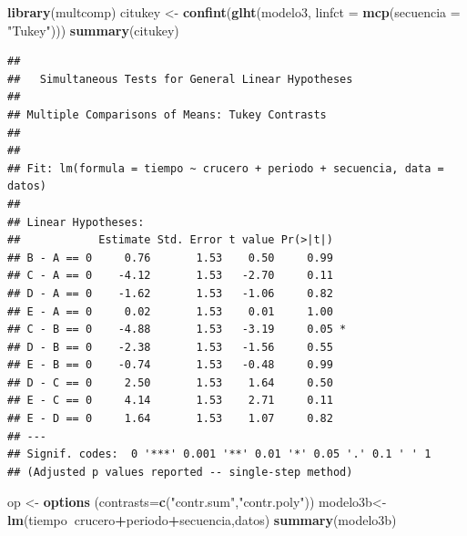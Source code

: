 \documentclass[]{book}
\newenvironment{Shaded}{\begin{snugshade}}{\end{snugshade}}
\newcommand{\KeywordTok}[1]{\textcolor[rgb]{0.13,0.29,0.53}{\textbf{#1}}}
\newcommand{\DataTypeTok}[1]{\textcolor[rgb]{0.13,0.29,0.53}{#1}}
\newcommand{\StringTok}[1]{\textcolor[rgb]{0.31,0.60,0.02}{#1}}
\newcommand{\OperatorTok}[1]{\textcolor[rgb]{0.81,0.36,0.00}{\textbf{#1}}}
\newcommand{\NormalTok}[1]{#1}
\begin{document}
\begin{Shaded}
\begin{Highlighting}[]
\KeywordTok{library}\NormalTok{(multcomp)}
\NormalTok{citukey <-}\StringTok{ }\KeywordTok{confint}\NormalTok{(}\KeywordTok{glht}\NormalTok{(modelo3, }\DataTypeTok{linfct =} \KeywordTok{mcp}\NormalTok{(}\DataTypeTok{secuencia =} \StringTok{"Tukey"}\NormalTok{)))}
\KeywordTok{summary}\NormalTok{(citukey)}
\end{Highlighting}
\end{Shaded}

\begin{verbatim}
## 
##   Simultaneous Tests for General Linear Hypotheses
## 
## Multiple Comparisons of Means: Tukey Contrasts
## 
## 
## Fit: lm(formula = tiempo ~ crucero + periodo + secuencia, data = datos)
## 
## Linear Hypotheses:
##            Estimate Std. Error t value Pr(>|t|)  
## B - A == 0     0.76       1.53    0.50     0.99  
## C - A == 0    -4.12       1.53   -2.70     0.11  
## D - A == 0    -1.62       1.53   -1.06     0.82  
## E - A == 0     0.02       1.53    0.01     1.00  
## C - B == 0    -4.88       1.53   -3.19     0.05 *
## D - B == 0    -2.38       1.53   -1.56     0.55  
## E - B == 0    -0.74       1.53   -0.48     0.99  
## D - C == 0     2.50       1.53    1.64     0.50  
## E - C == 0     4.14       1.53    2.71     0.11  
## E - D == 0     1.64       1.53    1.07     0.82  
## ---
## Signif. codes:  0 '***' 0.001 '**' 0.01 '*' 0.05 '.' 0.1 ' ' 1
## (Adjusted p values reported -- single-step method)
\end{verbatim}

\begin{Shaded}
\begin{Highlighting}[]
\NormalTok{op <-}\StringTok{ }\KeywordTok{options}\NormalTok{ (}\DataTypeTok{contrasts=}\KeywordTok{c}\NormalTok{(}\StringTok{"contr.sum"}\NormalTok{,}\StringTok{"contr.poly"}\NormalTok{))}
\NormalTok{modelo3b<-}\KeywordTok{lm}\NormalTok{(tiempo}\OperatorTok{~}\NormalTok{crucero}\OperatorTok{+}\NormalTok{periodo}\OperatorTok{+}\NormalTok{secuencia,datos)}
\KeywordTok{summary}\NormalTok{(modelo3b)}
\end{Highlighting}
\end{Shaded}
\end{document}
